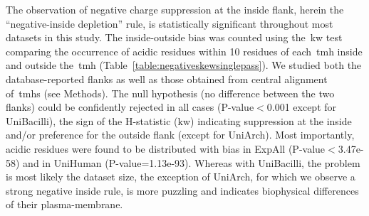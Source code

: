 The observation of negative charge suppression at the inside flank, herein the ``negative-inside depletion'' rule, is statistically significant throughout most datasets in this study.
The inside-outside bias was counted using the~\gls{kw} test comparing the occurrence of acidic residues within 10 residues of each~\gls{tmh} inside and outside the~\gls{tmh} (Table~\ref{table:negativeskewsinglepass}).
We studied both the database-reported flanks as well as those obtained from central alignment of~\gls{tmh}s (see Methods).
The null hypothesis (no difference between the two flanks) could be confidently rejected in all cases (P\--value$<$0.001 except for UniBacilli), the sign of the H-statistic (\gls{kw}) indicating suppression at the inside and/or preference for the outside flank (except for UniArch).
Most importantly, acidic residues were found to be distributed with bias in ExpAll (P\--value$<$3.47e-58) and in UniHuman (P\--value=1.13e-93).
Whereas with UniBacilli, the problem is most likely the dataset size, the exception of UniArch, for which we observe a strong negative inside rule, is more puzzling and indicates biophysical differences of their plasma-membrane.

